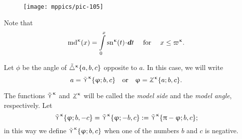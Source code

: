 {

\begin{wrapfigure}{r}{44mm}
\centering
\texttt{[image: mppics/pic-105]}
\end{wrapfigure}

Note that
\[
\mdk(x)=\int\limits_0^x
\snk(t)\cdot\dd t \quad \text{ for }\quad x\le \varpi\kappa.
\]

Let $\phi$ be the angle of ${\tilde\triangle}^{\upkappa}\{a,b,c\}$ 
opposite to $a$.
In this case, we will write \label{page:model-side}%
%
\[a
=
\side\kappa\{\phi;b,c\}
\quad \text{or}\quad 
\phi
=
\tangle\mc\kappa\{a;b,c\}.\]

}

The functions $\mathop{\tilde\curlyvee}\nolimits^{\upkappa}$ and $\tangle\mc\kappa$ will be called the \emph{model side} and the \emph{model angle}, respectively.
Let 
\[
\mathop{\tilde\curlyvee}\nolimits^{\upkappa}\{\upvarphi;b,-c\}
=\mathop{\tilde\curlyvee}\nolimits^{\upkappa}\{\upvarphi;-b,c\}
:=\mathop{\tilde\curlyvee}\nolimits^{\upkappa}\{\uppi-\upvarphi;b,c\};\]
in this way we define $\mathop{\tilde\curlyvee}\nolimits^{\upkappa}\{\upvarphi;b,c\}$ when one of the numbers $b$ and $c$ is negative. %

\pagebreak%

